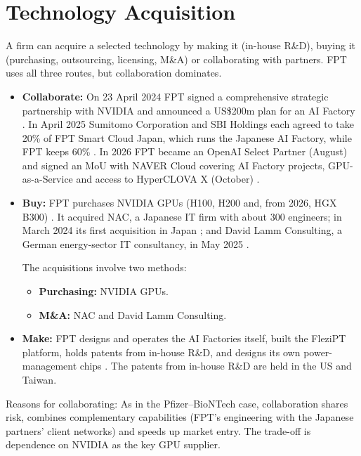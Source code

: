\documentclass[a4paper,12pt]{report}
\begin{document}
\chapter{Technology Acquisition}

A firm can acquire a selected technology by making it (in-house R\&D),
buying it (purchasing, outsourcing, licensing, M\&A) or collaborating
with partners. FPT uses all three routes, but collaboration dominates.

\begin{itemize}
    \item \textbf{Collaborate:} On 23 April 2024 FPT signed a comprehensive
    strategic partnership with NVIDIA and announced a US\$200m plan for
    an AI Factory \cite{S5}. In April 2025 Sumitomo Corporation and SBI
    Holdings each agreed to take 20\% of FPT Smart Cloud Japan, which
    runs the Japanese AI Factory, while FPT keeps 60\% \cite{S6}.
    In 2026 FPT became an OpenAI Select Partner (August) and signed an
    MoU with NAVER Cloud covering AI Factory projects, GPU-as-a-Service
    and access to HyperCLOVA X (October) \cite{S8,S9}.

    \item \textbf{Buy:} FPT purchases NVIDIA GPUs (H100, H200 and,
    from 2026, HGX B300) \cite{S7,S10}. It acquired NAC, a Japanese IT
    firm with about 300 engineers; in March 2024 its first acquisition
    in Japan \cite{S11}; and David Lamm Consulting, a German energy-sector
    IT consultancy, in May 2025 \cite{S12}.

    The acquisitions involve two methods:
    \begin{itemize}
        \item \textbf{Purchasing:} NVIDIA GPUs.
        \item \textbf{M\&A:} NAC and David Lamm Consulting.
    \end{itemize}

    \item \textbf{Make:} FPT designs and operates the AI Factories itself,
    built the FleziPT platform, holds patents from in-house R\&D, and
    designs its own power-management chips \cite{S13,S14,S19}.
    The patents from in-house R\&D are held in the US and Taiwan.
\end{itemize}

Reasons for collaborating: As in the Pfizer--BioNTech case, collaboration shares risk, combines complementary capabilities (FPT's engineering with the Japanese partners' client networks) and speeds up market entry. The trade-off is dependence on NVIDIA as the key GPU supplier.
\end{document}
